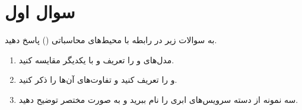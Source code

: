 \section{سوال اول}

به سوالات زیر در رابطه با محیط‌های محاسباتی () پاسخ دهید.

\begin{enumerate}
	\item 
	مدل‌های  و  را تعریف و با یکدیگر مقایسه کنید.
	
	\begin{qsolve}
		
	\end{qsolve}
	
	\item 
	و  را تعریف کنید و تفاوت‌های آن‌ها را ذکر کنید.
	
	\begin{qsolve}
		
	\end{qsolve}
	
	\item 
	سه نمونه از دسته سرویس‌های ابری را نام ببرید و به صورت مختصر توضیح دهید.
	
	\begin{qsolve}
		
	\end{qsolve}
\end{enumerate}